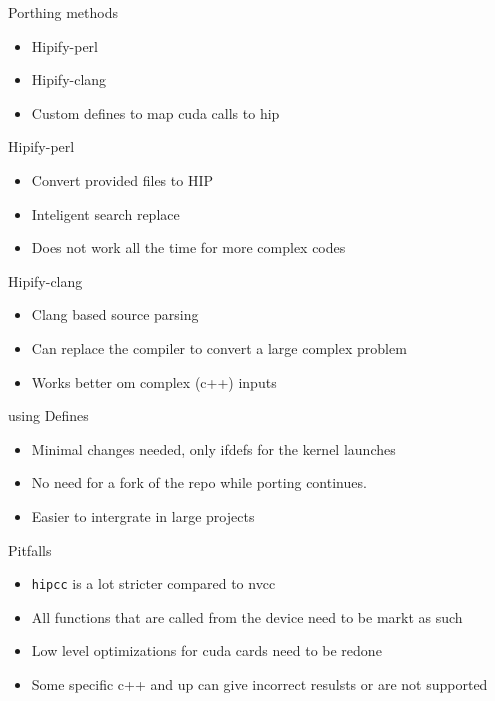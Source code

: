 \documentclass[aspectratio=169]{beamer}
\begin{document}
\begin{frame}{Porthing methods}
\begin{itemize}
    \item Hipify-perl 
    \item Hipify-clang
    \item Custom defines to map cuda calls to hip
\end{itemize}
\end{frame}

\begin{frame}{Hipify-perl}
\begin{itemize}
    \item Convert provided files to HIP
    \item Inteligent search replace
    \item Does not work all the time for more complex codes
\end{itemize}

\end{frame}

\begin{frame}{Hipify-clang}
\begin{itemize}
    \item Clang based source parsing
    \item Can replace the compiler to convert a large complex problem
    \item Works better om complex (c++) inputs
\end{itemize}
\end{frame}

\begin{frame}{using Defines}
\begin{itemize}
    \item Minimal changes needed, only ifdefs for the kernel launches 
    \item No need for a fork of the repo while porting continues.
    \item Easier to intergrate in large projects
\end{itemize}
\end{frame}

\begin{frame}{Pitfalls}
\begin{itemize}
    \item \texttt{hipcc} is a lot stricter compared to nvcc
    \item All functions that are called from the device need to be markt as such
    \item Low level optimizations for cuda cards need to be redone
    \item Some specific c++ and up can give incorrect resulsts or are not supported
    
\end{itemize}
\end{frame}
\end{document}
